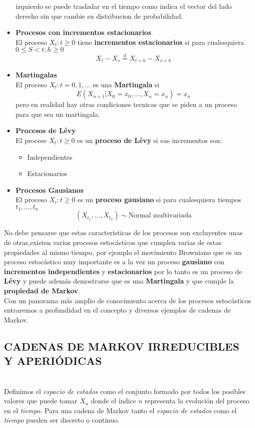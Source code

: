 \documentclass[10pt,a4paper]{article}
\theoremstyle{definition}
\theoremstyle{remark}
\begin{document}
\begin{multicols}{2}
\begin{itemize}
	izquierdo se puede trasladar en el tiempo como indica el vector del lado derecho sin 
	que cambie su distribucion de probabilidad.\\
	\item \textbf{Procesos con incrementos estacionarios}\\
	El proceso ${X_t : t \geq 0}$ tiene \textbf{incrementos estacionarios} si para 
	cualesquiera $0\leq S < t; h \geq 0 $ $$X_t - X_s \stackrel{d}{=} X_{t+h} - X_{s+h} 
	$$
	\item \textbf{Martingalas} \\
	El proceso ${X_t : t = 0,1,\dots}$ es una \textbf{Martingala} si $$E(X_{n+1}|
	X_0=x_0,\dots,X_n=x_n)=x_n$$ pero en realidad hay otras condiciones tecnicas que se 
	piden a un proceso para que sea un martingala.\\
	\item \textbf{Procesos de Lévy} \\
	El procese ${X_t: t\geq0}$ es un \textbf{proceso de Lévy} si sus incrementos son:
	\begin{itemize}
		\item Independientes
		\item Estacionarios
	\end{itemize}
	\item \textbf{Procesos Gausianos}\\
	El proceso $X_t: t\geq 0$ es un \textbf{proceso gausiano} si para cualesquiera 
	tiempos $t_1,\dots,t_n$ 
	$$(X_{t_1},\dots,X_{t_n}) \sim \mbox{Normal multivariada}$$
\end{itemize}
\noindent No debe pensarse que estas características de los procesos son 
excluyentes unas de otras,existen varios procesos estocásticos que cumplen 
varias de estas propiedades al mismo tiempo, por ejemplo el movimiento Browniano que es un proceso estocástico muy importante es a la vez un proceso \textbf{gausiano} con \textbf{incrementos 
independientes} y \textbf{estacionarios} por lo tanto es un proceso de \textbf{Lévy} y 
puede además demostrarse que es una \textbf{Martingala} y que cumple la 
\textbf{propiedad de Markov}.\\

\noindent Con un panorama más amplio de conocimiento acerca de los procesos estocásticos entraremos a profundidad en el concepto y diversos ejemplos de cadenas de Markov.\\
\subsection{CADENAS DE MARKOV IRREDUCIBLES Y APERIÓDICAS}
\\
Definimos el \textit{espacio de estados} como el conjunto formado por todos los posibles 
valores que puede tomar $X_{n}$ donde el índice $n$ representa la evolución del proceso 
en el \textit{tiempo}. Para una cadena de Markov tanto el \textit{espacio de estados} 
como el \textit{tiempo} pueden ser discreto o continuo.\\


\end{multicols}
\end{document}
